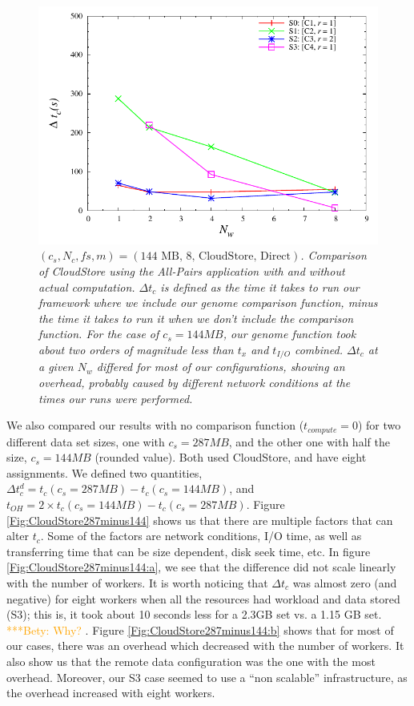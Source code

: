 \documentclass{rspublic}
\newcommand{\betynote}[1]{ {\textcolor{orange} { ***Bety: #1 }}}
\begin{document}
\begin{figure}
\begin{center}
\includegraphics[scale=0.5]{data/graphs/CloudStoreComputeMinusNoCompute144}
\caption{\textit{$(c_s, N_c, fs, m) = (\mbox{144 MB, 8, CloudStore,
Direct})$. Comparison of CloudStore using the All-Pairs application with
and without actual computation. $\Delta t_c$ is defined as the time it
takes to run our framework where we include our genome comparison
function, minus the time it takes to run it when we don't include the
comparison function. For the case of $c_s=144MB$, our genome function
took about two orders of magnitude less than $t_x$ and $t_{I/O}$
combined. $\Delta t_c$ at a given $N_w$ differed for most of our
configurations, showing an overhead, probably caused by different
network conditions at the times our runs were performed.}}
\label{Fig:experiment4}
\end{center}
\end{figure}

We also compared our results with no comparison function
($t_{compute}=0$) for two different data set sizes, one with $c_s =
287MB$, and the other one with half the size, $c_s = 144MB$ (rounded
value). Both used CloudStore, and have eight assignments. We defined two
quantities, $\Delta t_c^d = t_c(c_s = 287MB) - t_c(c_s = 144MB)$, and
$t_{OH} = 2 \times t_c(c_s = 144MB) - t_c(c_s = 287MB)$. Figure
\ref{Fig:CloudStore287minus144} shows us that there are multiple factors
that can alter $t_c$. Some of the factors are network conditions, I/O
time, as well as transferring time that can be size dependent, disk seek
time, etc. In figure \ref{Fig:CloudStore287minus144:a}, we see that the
difference did not scale linearly with the number of workers. It is
worth noticing that $\Delta t_c$ was almost zero (and negative) for
eight workers when all the resources had workload and data stored (S3);
this is, it took about 10 seconds less for a 2.3GB set vs. a 1.15 GB
set. \betynote {Why?}. Figure \ref{Fig:CloudStore287minus144:b} shows
that for most of our cases, there was an overhead which decreased with
the number of workers. It also show us that the remote data
configuration was the one with the most overhead. Moreover, our S3 case
seemed to use a ``non scalable'' infrastructure, as the overhead
increased with eight workers.
\end{document}
